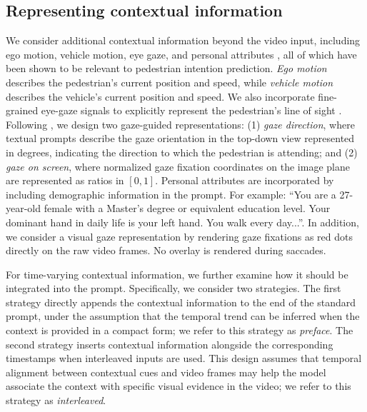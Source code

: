 \documentclass[letterpaper, 10pt, journal]{IEEEtran}  %
\newcommand{\prompt}[1]{#1}
\begin{document}
\subsection{Representing contextual information}
\label{sec:contex}


We consider additional contextual information beyond the video input, including ego motion, vehicle motion, eye gaze, and personal attributes \cite{li2026eye, li2025analyzing}, all of which have been shown to be relevant to pedestrian intention prediction. \emph{Ego motion} describes the pedestrian's current position and speed, while \emph{vehicle motion} describes the vehicle's current position and speed. We also incorporate fine-grained eye-gaze signals to explicitly represent the pedestrian's line of sight \cite{li_challenges_2025}. Following \cite{peng2025eye, li2026eye}, we design two gaze-guided representations: (1) \emph{gaze direction}, where textual prompts describe the gaze orientation in the top-down view represented in degrees, indicating the direction to which the pedestrian is attending; and (2) \emph{gaze on screen}, where normalized gaze fixation coordinates on the image plane are represented as ratios in $[0,1]$. Personal attributes are incorporated by including demographic information in the prompt. For example: \prompt{``You are a 27-year-old female with a Master's degree or equivalent education level. Your dominant hand in daily life is your left hand. You walk every day...''.} In addition, we consider a visual gaze representation by rendering gaze fixations as red dots directly on the raw video frames. No overlay is rendered during saccades.

For time-varying contextual information, we further examine how it should be integrated into the prompt. Specifically, we consider two strategies. The first strategy directly appends the contextual information to the end of the standard prompt, under the assumption that the temporal trend can be inferred when the context is provided in a compact form; we refer to this strategy as \emph{preface}. The second strategy inserts contextual information alongside the corresponding timestamps when interleaved inputs are used. This design assumes that temporal alignment between contextual cues and video frames may help the model associate the context with specific visual evidence in the video; we refer to this strategy as \emph{interleaved}.
\end{document}
